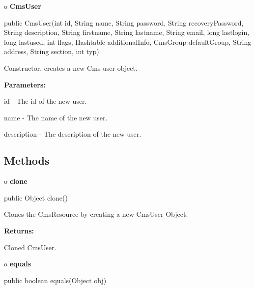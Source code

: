 o {\bf CmsUser} 

\begin{PRE}
 public CmsUser(int id,
                String name,
                String password,
                String recoveryPassword,
                String description,
                String firstname,
                String lastname,
                String email,
                long lastlogin,
                long lastused,
                int flags,
                Hashtable additionalInfo,
                CmsGroup defaultGroup,
                String address,
                String section,
                int typ)
\end{PRE}

\begin{description}
\htmlDD Constructor, creates a new Cms user object. 

\begin{description}
\item {\bf Parameters:}  

id - The id of the new user.  

name - The name of the new user.  

description - The description of the new user.  
\end{description}

\end{description}

\subsection*{  Methods }

o {\bf clone} 

\begin{PRE}
 public Object clone()
\end{PRE}

\begin{description}
\htmlDD Clones the CmsResource by creating a new CmsUser Object. 

\begin{description}
\item {\bf Returns:}  

Cloned CmsUser.  
\end{description}

\end{description}

o {\bf equals} 

\begin{PRE}
 public boolean equals(Object obj)
\end{PRE}

